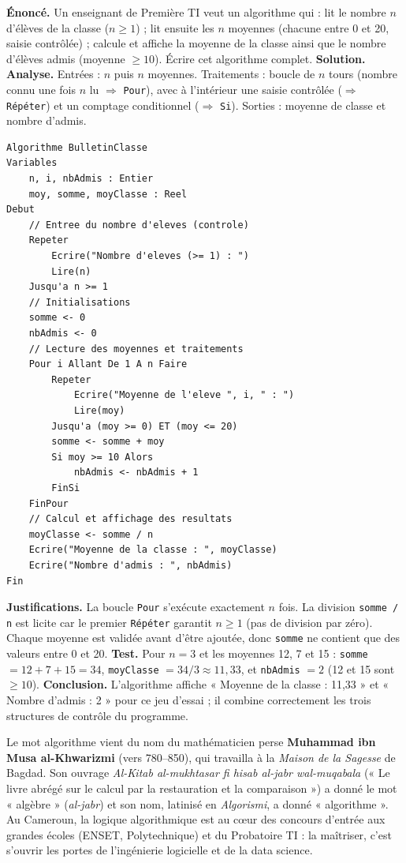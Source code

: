 \documentclass[11pt]{article}
\newcommand{\cle}[1]{{\popxbold\color{popdark}#1}}
\begin{document}
\begin{exoresolu}
\textbf{Énoncé.} Un enseignant de Première TI veut un algorithme qui : lit le nombre $n$ d'élèves de la classe ($n \geq 1$) ; lit ensuite les $n$ moyennes (chacune entre 0 et 20, saisie contrôlée) ; calcule et affiche la moyenne de la classe ainsi que le nombre d'élèves admis (moyenne $\geq 10$). Écrire cet algorithme complet.
\tcblower
\textbf{Solution.}
\textbf{Analyse.} Entrées : $n$ puis $n$ moyennes. Traitements : boucle de $n$ tours (nombre connu une fois $n$ lu $\Rightarrow$ \texttt{Pour}), avec à l'intérieur une saisie contrôlée ($\Rightarrow$ \texttt{Répéter}) et un comptage conditionnel ($\Rightarrow$ \texttt{Si}). Sorties : moyenne de classe et nombre d'admis.
\begin{lstlisting}
Algorithme BulletinClasse
Variables
    n, i, nbAdmis : Entier
    moy, somme, moyClasse : Reel
Debut
    // Entree du nombre d'eleves (controle)
    Repeter
        Ecrire("Nombre d'eleves (>= 1) : ")
        Lire(n)
    Jusqu'a n >= 1
    // Initialisations
    somme <- 0
    nbAdmis <- 0
    // Lecture des moyennes et traitements
    Pour i Allant De 1 A n Faire
        Repeter
            Ecrire("Moyenne de l'eleve ", i, " : ")
            Lire(moy)
        Jusqu'a (moy >= 0) ET (moy <= 20)
        somme <- somme + moy
        Si moy >= 10 Alors
            nbAdmis <- nbAdmis + 1
        FinSi
    FinPour
    // Calcul et affichage des resultats
    moyClasse <- somme / n
    Ecrire("Moyenne de la classe : ", moyClasse)
    Ecrire("Nombre d'admis : ", nbAdmis)
Fin
\end{lstlisting}
\textbf{Justifications.} La boucle \texttt{Pour} s'exécute exactement $n$ fois. La division \texttt{somme / n} est licite car le premier \texttt{Répéter} garantit $n \geq 1$ (pas de division par zéro). Chaque moyenne est validée avant d'être ajoutée, donc \texttt{somme} ne contient que des valeurs entre 0 et 20.
\textbf{Test.} Pour $n = 3$ et les moyennes 12, 7 et 15 : \texttt{somme} $= 12 + 7 + 15 = 34$, \texttt{moyClasse} $= 34/3 \approx 11{,}33$, et \texttt{nbAdmis} $= 2$ (12 et 15 sont $\geq 10$).
\textbf{Conclusion.} L'algorithme affiche « Moyenne de la classe : 11,33 » et « Nombre d'admis : 2 » pour ce jeu d'essai ; il combine correctement les trois structures de contrôle du programme.
\end{exoresolu}

\begin{savaistu}
Le mot \cle{algorithme} vient du nom du mathématicien perse \textbf{Muhammad ibn Musa al-Khwarizmi} (vers 780--850), qui travailla à la \emph{Maison de la Sagesse} de Bagdad. Son ouvrage \emph{Al-Kitab al-mukhtasar fi hisab al-jabr wal-muqabala} (« Le livre abrégé sur le calcul par la restauration et la comparaison ») a donné le mot « algèbre » (\emph{al-jabr}) et son nom, latinisé en \emph{Algorismi}, a donné « algorithme ». Au Cameroun, la logique algorithmique est au cœur des concours d'entrée aux grandes écoles (ENSET, Polytechnique) et du Probatoire TI : la maîtriser, c'est s'ouvrir les portes de l'ingénierie logicielle et de la data science.
\end{savaistu}
\end{document}
